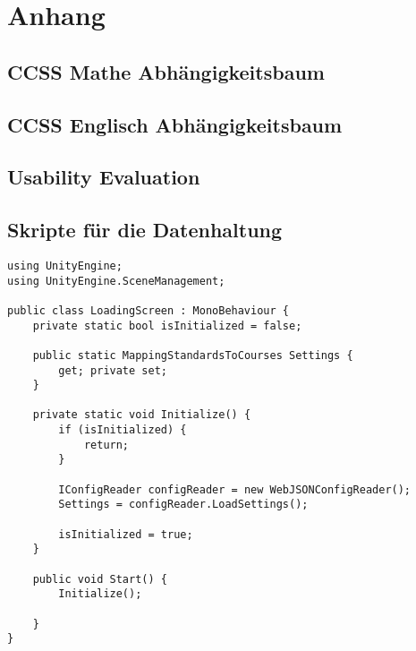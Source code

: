 \chapter*{Anhang}
\section*{CCSS Mathe Abhängigkeitsbaum}
	\label{CCSSMath}
	\begin{center}
		
	\end{center}

\section*{CCSS Englisch Abhängigkeitsbaum}
	\label{CCSSEnglish}
	\begin{center}
		
	\end{center}
	
\section*{Usability Evaluation}
	\label{UEMarcel}
	\begin{center}
		
	\end{center}
\section*{Skripte für die Datenhaltung}
	\label{anhang4}

\begin{scriptsize}
				\lstset{
					float,
					caption=LoadingScreen.cs, 
					language=[Sharp]C, 
					frame=single,  
					showstringspaces=false, 
					showspaces=false, 
					numbers=left, 
					captionpos=b, 
					belowcaptionskip=4pt,
					basicstyle=\ttfamily
				} 
				\begin{lstlisting}[label=lst:methode34]
using UnityEngine;
using UnityEngine.SceneManagement;

public class LoadingScreen : MonoBehaviour {
    private static bool isInitialized = false;

    public static MappingStandardsToCourses Settings {
        get; private set;
    }

    private static void Initialize() {
        if (isInitialized) {
            return;
        }

        IConfigReader configReader = new WebJSONConfigReader();
        Settings = configReader.LoadSettings();

        isInitialized = true;
    }

    public void Start() {
        Initialize();

    }
}
				\end{lstlisting}
			\end{scriptsize}

